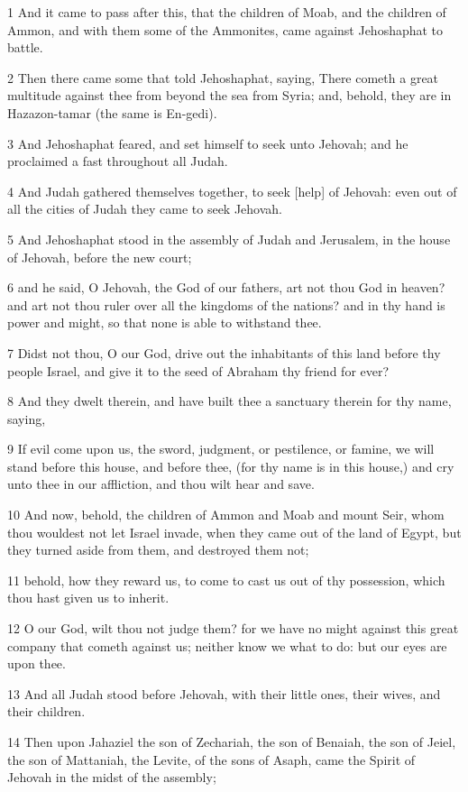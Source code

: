 \par 1 And it came to pass after this, that the children of Moab, and the children of Ammon, and with them some of the Ammonites, came against Jehoshaphat to battle.
\par 2 Then there came some that told Jehoshaphat, saying, There cometh a great multitude against thee from beyond the sea from Syria; and, behold, they are in Hazazon-tamar (the same is En-gedi).
\par 3 And Jehoshaphat feared, and set himself to seek unto Jehovah; and he proclaimed a fast throughout all Judah.
\par 4 And Judah gathered themselves together, to seek [help] of Jehovah: even out of all the cities of Judah they came to seek Jehovah.
\par 5 And Jehoshaphat stood in the assembly of Judah and Jerusalem, in the house of Jehovah, before the new court;
\par 6 and he said, O Jehovah, the God of our fathers, art not thou God in heaven? and art not thou ruler over all the kingdoms of the nations? and in thy hand is power and might, so that none is able to withstand thee.
\par 7 Didst not thou, O our God, drive out the inhabitants of this land before thy people Israel, and give it to the seed of Abraham thy friend for ever?
\par 8 And they dwelt therein, and have built thee a sanctuary therein for thy name, saying,
\par 9 If evil come upon us, the sword, judgment, or pestilence, or famine, we will stand before this house, and before thee, (for thy name is in this house,) and cry unto thee in our affliction, and thou wilt hear and save.
\par 10 And now, behold, the children of Ammon and Moab and mount Seir, whom thou wouldest not let Israel invade, when they came out of the land of Egypt, but they turned aside from them, and destroyed them not;
\par 11 behold, how they reward us, to come to cast us out of thy possession, which thou hast given us to inherit.
\par 12 O our God, wilt thou not judge them? for we have no might against this great company that cometh against us; neither know we what to do: but our eyes are upon thee.
\par 13 And all Judah stood before Jehovah, with their little ones, their wives, and their children.
\par 14 Then upon Jahaziel the son of Zechariah, the son of Benaiah, the son of Jeiel, the son of Mattaniah, the Levite, of the sons of Asaph, came the Spirit of Jehovah in the midst of the assembly;

